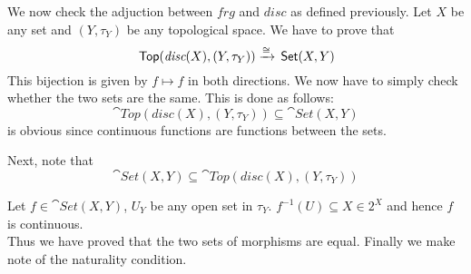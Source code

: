 \begin{frame}
    
We now check the adjuction between \(frg\) and \(disc\) as  defined previously.
Let \(X \) be any set and \((Y,\tau_Y)\) be any topological space. We have to
prove that 
\begin{equation}
    \,\textsf{Top}(\textit{disc}(X) , (Y, \tau_Y)  ) \xrightarrow{\cong} \,\textsf{Set}(X, Y)
\end{equation}
This bijection is given by  \(f \mapsto f \) in both directions. We now have to
simply check whether the two sets are the same. This is done as follows: 
\begin{equation}
    \cat{Top}(\textit{disc}(X) , (Y, \tau_Y)  ) \subseteq \cat{Set}(X, Y)
\end{equation}
is obvious since continuous functions are functions between the sets. 
\end{frame}
\begin{frame}
    
Next, note that 
\begin{equation}
    \cat{Set}(X, Y) \subseteq \cat{Top}(\textit{disc}(X) , (Y, \tau_Y)  )
\end{equation}

    Let \(f \in \cat{Set}(X,Y)\),  \(U_Y\) be any open set in \(\tau_Y\).
    \(f^{-1}(U) \subseteq X \in 2^X\) and hence \(f\) is continuous. \\
    Thus we have proved that the two sets of morphisms are equal. Finally we make note of the
    naturality condition. 
\end{frame}
